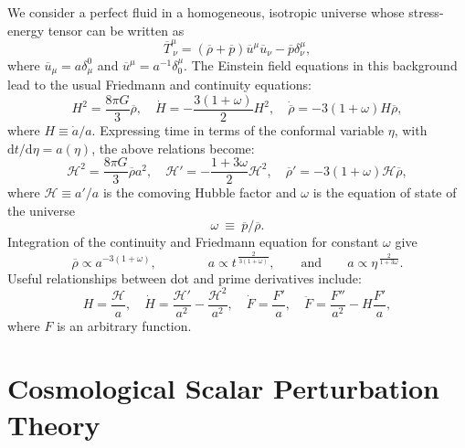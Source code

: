 \documentclass[twocolumn,superscriptaddress,aps,preprintnumbers,amsmath,amssymb,prl,footinbib]{revtex4-2}
\begin{document}
We consider a perfect fluid in a homogeneous, isotropic universe whose stress-energy tensor can be written as
\begin{equation}
    \overline{T}^\mu_{\ \nu} = (\overline{\rho} + \overline{p})\overline{u}^\mu \overline{u}_\nu - \overline{p}\delta^\mu_\nu,
\end{equation}
where $\overline{u}_\mu = a\delta^0_\mu$ and $\overline{u}^\mu = a^{-1}\delta_0^\mu$. The Einstein field equations in this background lead to the usual Friedmann and continuity equations:
\begin{equation}
    H^2 = \frac{8\pi G}{3}\overline{\rho}, \quad
    \dot{H} = -\frac{3(1+\omega)}{2}H^2, \quad
    \dot{\overline{\rho}} =-3(1+\omega)H\overline{\rho},
\end{equation}
where $H \equiv \dot{a}/a$.
Expressing time in terms of the conformal variable $\eta$, with $\mathrm{d}t/\mathrm{d}\eta = a(\eta)$, the above relations become:
\begin{equation}
\label{eq:Friedmann_comoving}
    \mathcal{H}^2 = \frac{8\pi G}{3}\overline{\rho}a^2, \quad
    \mathcal{H}' =-\frac{1 + 3\omega}{2}\mathcal{H}^2, \quad
    \overline{\rho}' =- 3(1+\omega)\mathcal{H}\overline{\rho} ,
\end{equation}
where $\mathcal{H} \equiv a'/a$ is the comoving Hubble factor and $\omega$ is the equation of state of the universe
\begin{equation}
\label{eq:EoS}
\omega~\equiv~ \overline{p} /\overline{\rho}.
\end{equation}
Integration of the continuity and Friedmann equation for constant $\omega$ give
\begin{equation}
    \overline{\rho} \propto a^{-3(1+\omega)},\qquad \qquad
    a \propto t^{\,\frac{2}{3(1+\omega)}},\qquad \textrm{and}\qquad
    a \propto \eta^{\,\frac{2}{1+3\omega}}.
\end{equation}
Useful relationships between dot and prime derivatives include:
\begin{equation}
    H = \frac{\mathcal{H}}{a}, \quad
    \dot{H} = \frac{\mathcal{H}'}{a^2} - \frac{\mathcal{H}^2}{a^2}, \quad
    \dot{F} = \frac{F'}{a}, \quad
    \ddot{F} = \frac{F''}{a^2} - H\frac{F'}{a},
\end{equation}
where $F$ is an arbitrary function.


\section{Cosmological Scalar Perturbation Theory}
\end{document}

